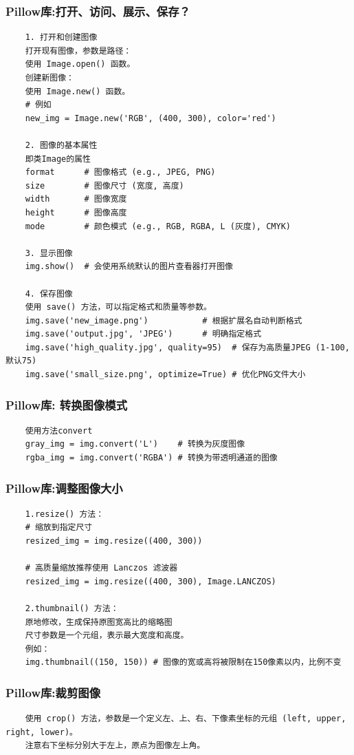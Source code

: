 \documentclass[UTF8]{ctexart}
\begin{document}
\subsubsection{Pillow库:打开、访问、展示、保存？}
\begin{verbatim}
	1. 打开和创建图像
	打开现有图像，参数是路径：
	使用 Image.open() 函数。
	创建新图像：
	使用 Image.new() 函数。
	# 例如
	new_img = Image.new('RGB', (400, 300), color='red')

	2. 图像的基本属性
	即类Image的属性
	format      # 图像格式 (e.g., JPEG, PNG)
	size        # 图像尺寸 (宽度, 高度)
	width       # 图像宽度
	height      # 图像高度
	mode        # 颜色模式 (e.g., RGB, RGBA, L (灰度), CMYK)

	3. 显示图像
	img.show()  # 会使用系统默认的图片查看器打开图像
	
	4. 保存图像
	使用 save() 方法，可以指定格式和质量等参数。
	img.save('new_image.png')           # 根据扩展名自动判断格式
	img.save('output.jpg', 'JPEG')      # 明确指定格式
	img.save('high_quality.jpg', quality=95)  # 保存为高质量JPEG (1-100, 默认75)
	img.save('small_size.png', optimize=True) # 优化PNG文件大小
\end{verbatim}

\subsubsection{Pillow库: 转换图像模式}
\begin{verbatim}
	使用方法convert
	gray_img = img.convert('L')    # 转换为灰度图像
	rgba_img = img.convert('RGBA') # 转换为带透明通道的图像
\end{verbatim}

\subsubsection{Pillow库:调整图像大小}
\begin{verbatim}
	1.resize() 方法：
	# 缩放到指定尺寸
	resized_img = img.resize((400, 300))

	# 高质量缩放推荐使用 Lanczos 滤波器
	resized_img = img.resize((400, 300), Image.LANCZOS)

	2.thumbnail() 方法：
	原地修改，生成保持原图宽高比的缩略图
	尺寸参数是一个元组，表示最大宽度和高度。
	例如：
	img.thumbnail((150, 150)) # 图像的宽或高将被限制在150像素以内，比例不变
\end{verbatim}

\subsubsection{Pillow库:裁剪图像}
\begin{verbatim}
	使用 crop() 方法，参数是一个定义左、上、右、下像素坐标的元组 (left, upper, right, lower)。
	注意右下坐标分别大于左上，原点为图像左上角。
\end{verbatim}
\end{document}
